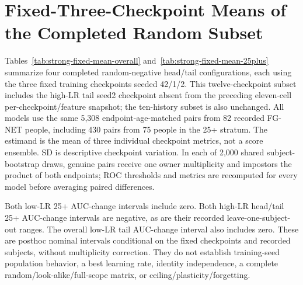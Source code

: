 \documentclass[journal]{IEEEtran}
\begin{document}
\section{Fixed-Three-Checkpoint Means of the Completed Random Subset}
\label{sec:strong-fixed-means}
Tables~\ref{tab:strong-fixed-mean-overall} and~\ref{tab:strong-fixed-mean-25plus}
summarize four completed random-negative head/tail configurations, each using
the three fixed training checkpoints seeded 42/1/2. This twelve-checkpoint
subset includes the high-LR tail seed2 checkpoint absent from the preceding
eleven-cell per-checkpoint/feature snapshot; the ten-history subset is also
unchanged. All models use the same 5,308 endpoint-age-matched pairs from
82 recorded FG-NET people, including 430 pairs from 75 people in the 25+ stratum.
The estimand is the mean of three individual checkpoint metrics, not a score
ensemble. SD is descriptive checkpoint variation. In each of 2,000 shared
subject-bootstrap draws, genuine pairs receive one owner multiplicity and
impostors the product of both endpoints; ROC thresholds and metrics are
recomputed for every model before averaging paired differences.

Both low-LR 25+ AUC-change intervals include zero. Both high-LR head/tail
25+ AUC-change intervals are negative, as are their recorded leave-one-subject-out
ranges. The overall low-LR tail AUC-change interval also includes zero.
These are posthoc nominal intervals conditional on the fixed checkpoints
and recorded subjects, without multiplicity correction. They do not establish
training-seed population behavior, a best learning rate, identity independence,
a complete random/look-alike/full-scope matrix, or ceiling/plasticity/forgetting.
\end{document}

